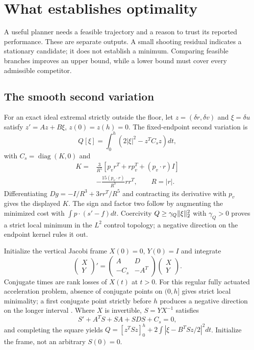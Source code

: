 \section{What establishes optimality}
\label{sec:verification}
A useful planner needs a feasible trajectory and a reason to trust its
reported performance. These are separate outputs. A small shooting
residual indicates a stationary candidate; it does not establish a
minimum. Comparing feasible branches improves an upper bound, while
a lower bound must cover every admissible competitor.

\subsection{The smooth second variation}
For an exact ideal extremal strictly outside the floor, let
$z=(\delta r,\delta v)$ and $\xi=\delta u$ satisfy
$z'=Az+B\xi$, $z(0)=z(h)=0$.
The fixed-endpoint second variation is
\begin{equation}
 Q[\xi]=\int_0^h\left(2|\xi|^2-z^TC_s z\right)dt,
 \label{eq:second}
\end{equation}
with $C_s=\operatorname{diag}(K,0)$ and
\begin{equation}
 \begin{split}
 K={}&\frac3{R^5}
 [p_vr^T+rp_v^T+(p_v\cdot r)I]\\
 &-\frac{15(p_v\cdot r)}{R^7}rr^T,\qquad R=|r|.
 \end{split}
\end{equation}
Differentiating $Dg=-I/R^3+3rr^T/R^5$ and contracting its
derivative with $p_v$ gives the displayed $K$.
The sign and factor two follow by augmenting the minimized cost with
$\int p\cdot(s'-f)dt$. Coercivity
$Q\ge\gamma_Q\lVert\xi\rVert_2^2$ with $\gamma_Q>0$ proves a strict
local minimum in the $L^2$ control topology; a negative direction on
the endpoint kernel rules it out.

Initialize the vertical Jacobi frame $X(0)=0$, $Y(0)=I$ and integrate
\begin{equation}
 \begin{pmatrix}X\\Y\end{pmatrix}'
 =\begin{pmatrix}A&D\\-C_s&-A^T\end{pmatrix}
 \begin{pmatrix}X\\Y\end{pmatrix}.
\end{equation}
Conjugate times are rank losses of $X(t)$ at $t>0$.
For this regular fully actuated acceleration problem, absence of
conjugate points on $(0,h]$ gives strict local minimality; a first
conjugate point strictly before $h$ produces a negative direction
on the longer interval \cite{Bonnard2007}.
Where $X$ is invertible, $S=YX^{-1}$ satisfies
\begin{equation}
 S'+A^TS+SA+SDS+C_s=0,
\end{equation}
and completing the square yields
$Q=[z^TSz]_0^h+2\int|\xi-B^TSz/2|^2dt$.
Initialize the frame, not an arbitrary $S(0)=0$.

